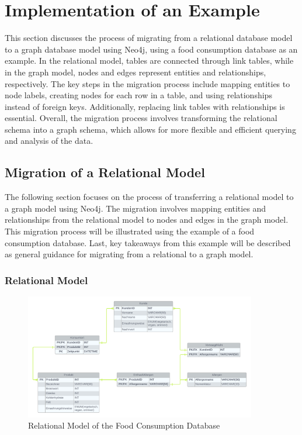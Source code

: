 \section{Implementation of an Example}\label{sec:implementationExampleNeo4j}

This section discusses the process of migrating from a relational database model to a graph database model using Neo4j, using a food consumption database as an example. In the relational model, tables are connected through link tables, while in the graph model, nodes and edges represent entities and relationships, respectively. The key steps in the migration process include mapping entities to node labels, creating nodes for each row in a table, and using relationships instead of foreign keys. Additionally, replacing link tables with relationships is essential. Overall, the migration process involves transforming the relational schema into a graph schema, which allows for more flexible and efficient querying and analysis of the data.

\subsection{Migration of a Relational Model}\label{subsec:migrationRelationModelNeo4j}

The following section focuses on the process of transferring a relational model to a graph model using Neo4j. The migration involves mapping entities and relationships from the relational model to nodes and edges in the graph model. This migration process will be illustrated using the example of a food consumption database. Last, key takeaways from this example will be described as general guidance for migrating from a relational to a graph model.

\subsubsection*{Relational Model}

\begin{figure}[H]
    \centering
    \caption{Relational Model of the Food Consumption Database}\label{fig:relationalModelNeo4j}
    \includegraphics[width=0.9\textwidth]{images/neo4j_example_relational_model.png}
\end{figure}

